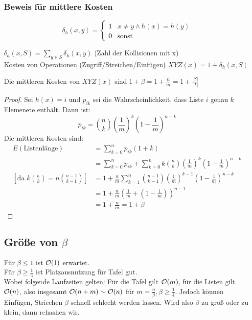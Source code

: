             \subsubsection{Beweis für mittlere Kosten}
            	\begin{definition}
            		$$\delta_h(x,y)=\begin{cases} 	1 & x\not=y\wedge h(x)=h(y)\\
            								0 & \text{sonst}
            					\end{cases}$$
            		
            		$\delta_h(x,S)=\sum\limits_{y\in S} \delta_h(x,y)$ (Zahl der Kollisionen mit x)\\
            		Kosten von Operationen (Zugriff/Streichen/Einfügen) $XYZ(x)=1+\delta_h(x,S)$      	
            	\end{definition}
            	\begin{satz}
            		Die mittleren Kosten von $XYZ(x)$ sind $1+\beta=1+\frac{n}{m}=1+\frac{|S|}{|T|}$
            	\end{satz}
            	\begin{proof}
            		Sei $h(x)=i$ und $p_{ik}$ sei die Wahrscheinlichkeit, dass Liste $i$ genau $k$ Elemenete enthält. Dann ist:
            		$$
            			p_{ik}={n\choose k}\left(\frac{1}{m}\right)^k\left(1-\frac{1}{m}\right)^{n-k}
            		$$
            		Die mittleren Kosten sind:
            		\begin{align*}
            			E(\text{Listenlänge}) 	&= \sum\limits_{k=0}^n p_{ik}(1+k)\\
            								&= \sum\limits_{k=0}^n p_{ik} 
            									+\sum\limits_{k=0}^n k{n\choose k}\left(\frac{1}{m}\right)^k\left(1-\frac{1}{m}\right)^{n-k}\\
            			\left[\text{da } k{n\choose k}=n{n-1\choose k-1}\right]
            								&= 1+\frac{n}{m}\sum\limits_{k=1}^n {n-1\choose k-1}
            										\left(\frac{1}{m}\right)^{k-1}\left(1-\frac{1}{m}\right)^{n-k}\\
            								&=1+\frac{n}{m}\left(\frac{1}{m}+\left(1-\frac{1}{m}\right)\right)^{n-1}\\
            								&=1+\frac{n}{m} = 1+ \beta
            		\end{align*}
            	\end{proof}
            	
            
        \subsection{Größe von $\beta$}
            Für $\beta \leq 1$ ist $\mathcal{O}(1)$ erwartet.\\
            Für $\beta \geq \frac{1}{4}$ ist Platzausnutzung für Tafel gut.\\
            Wobei folgende Laufzeiten gelten: Für die Tafel gilt $\mathcal{O}(m)$, für die Listen gilt $\mathcal{O}(n)$, 
            also insgesamt $\mathcal{O}(n+m) \sim \mathcal{O}(n)$ für $m = \frac{n}{\beta}, \beta \geq \frac{1}{4}$. 
            Jedoch können Einfügen, Striechen $\beta$ schnell schlecht werden lassen. Wird also $\beta$ zu groß oder zu klein, dann rehashen wir.
            
